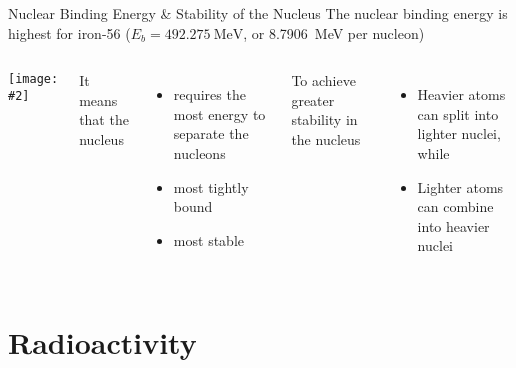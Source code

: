 \documentclass[12pt,compress,aspectratio=169]{beamer}
\newcommand{\pic}[2]{\texttt{[image: \#2]}}
\begin{document}
\begin{frame}{Nuclear Binding Energy \& Stability of the Nucleus}
  The nuclear binding energy is highest for iron-56
  ($E_b=\SI{492.275}{\mega\electronvolt}$, or \SI{8.7906}{\mega\electronvolt}
  per nucleon)

  \vspace{.1in}
  \begin{columns}
    \pic{1}{graphics/Binding-energy-curve}
 
    It means that the nucleus
    \begin{itemize}
    \item requires the most energy to separate the nucleons
    \item most tightly bound
    \item most stable
    \end{itemize}
    To achieve greater stability in the nucleus
    \begin{itemize}
    \item Heavier atoms can split into lighter nuclei, while
    \item Lighter atoms can combine into heavier nuclei
    \end{itemize}
  \end{columns}
\end{frame}






\section{Radioactivity}

\end{document}
